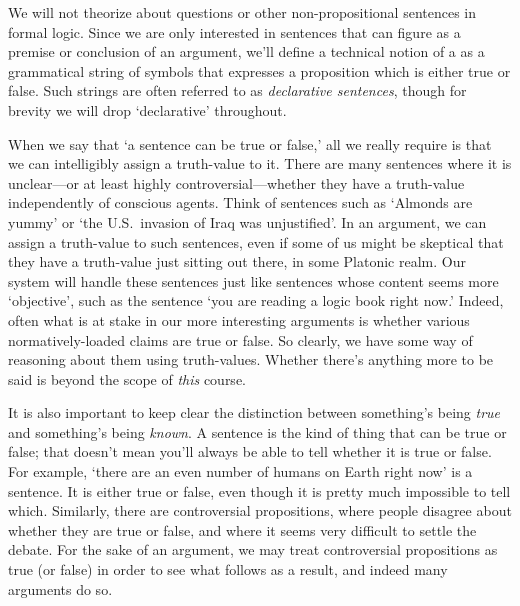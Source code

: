 
We will not theorize about questions or other non-propositional sentences in formal logic. Since we are only interested in sentences that can figure as a premise or conclusion of an argument, we'll define a technical notion of a  as a grammatical string of symbols that expresses a proposition which is either true or false. Such strings are often referred to as \textit{declarative sentences}, though for brevity we will drop `declarative' throughout.

When we say that `a sentence can be true or false,' all we really require is that we can intelligibly assign a truth-value to it. There are many sentences where it is unclear---or at least highly controversial---whether they have a truth-value independently of conscious agents. Think of sentences such as `Almonds are yummy' or `the U.S.\ invasion of Iraq was unjustified'. In an argument, we can assign a truth-value to such sentences, even if some of us might be skeptical that they have a truth-value just sitting out there, in some Platonic realm. Our system will handle these sentences just like sentences whose content seems more `objective', such as the sentence `you are reading a logic book right now.' Indeed, often what is at stake in our more interesting arguments is whether various normatively-loaded claims are true or false. So clearly, we have some way of reasoning about them using truth-values. Whether there's anything more to be said is beyond the scope of \textit{this} course.


It is also important to keep clear the distinction between something's being \emph{true} and something's being \emph{known}. A sentence is the kind of thing that can be true or false; that doesn't mean you'll always be able to tell whether it is true or false. For example, `there are an even number of humans on Earth right now' is a sentence. It is either true or false, even though it is pretty much impossible to tell which. Similarly, there are controversial propositions, where people disagree about whether they are true or false, and where it seems very difficult to settle the debate. For the sake of an argument, we may treat controversial propositions as true (or false) in order to see what follows as a result, and indeed many arguments do so. 

